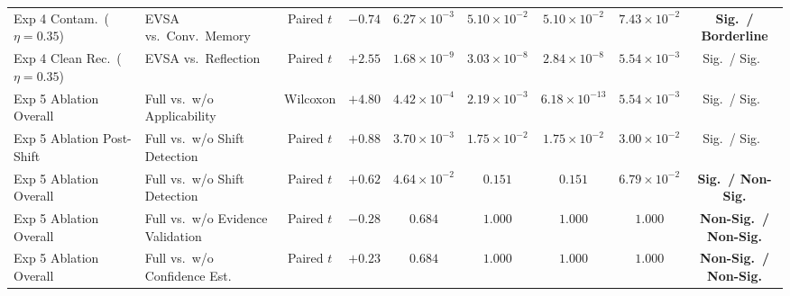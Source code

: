 \documentclass[10pt,letterpaper]{article}
\begin{document}
\begin{table}[t]
{\begin{tabular}{llccccccc}
Exp 4 Contam.\ ($\eta=0.35$) & EVSA vs.\ Conv.\ Memory & Paired $t$ & $-0.74$ & $6.27 \times 10^{-3}$ & $5.10 \times 10^{-2}$ & $5.10 \times 10^{-2}$ & $7.43 \times 10^{-2}$ & \textbf{Sig.\ / Borderline} \\
Exp 4 Clean Rec.\ ($\eta=0.35$) & EVSA vs.\ Reflection & Paired $t$ & $+2.55$ & $1.68 \times 10^{-9}$ & $3.03 \times 10^{-8}$ & $2.84 \times 10^{-8}$ & $5.54 \times 10^{-3}$ & Sig.\ / Sig.\ \\
Exp 5 Ablation Overall & Full vs.\ w/o Applicability & Wilcoxon & $+4.80$ & $4.42 \times 10^{-4}$ & $2.19 \times 10^{-3}$ & $6.18 \times 10^{-13}$ & $5.54 \times 10^{-3}$ & Sig.\ / Sig.\ \\
Exp 5 Ablation Post-Shift & Full vs.\ w/o Shift Detection & Paired $t$ & $+0.88$ & $3.70 \times 10^{-3}$ & $1.75 \times 10^{-2}$ & $1.75 \times 10^{-2}$ & $3.00 \times 10^{-2}$ & Sig.\ / Sig.\ \\
Exp 5 Ablation Overall & Full vs.\ w/o Shift Detection & Paired $t$ & $+0.62$ & $4.64 \times 10^{-2}$ & $0.151$ & $0.151$ & $6.79 \times 10^{-2}$ & \textbf{Sig.\ / Non-Sig.} \\
Exp 5 Ablation Overall & Full vs.\ w/o Evidence Validation & Paired $t$ & $-0.28$ & $0.684$ & $1.000$ & $1.000$ & $1.000$ & \textbf{Non-Sig.\ / Non-Sig.} \\
Exp 5 Ablation Overall & Full vs.\ w/o Confidence Est.\ & Paired $t$ & $+0.23$ & $0.684$ & $1.000$ & $1.000$ & $1.000$ & \textbf{Non-Sig.\ / Non-Sig.} \\
\bottomrule
\end{tabular}}
\end{table}

\end{document}
